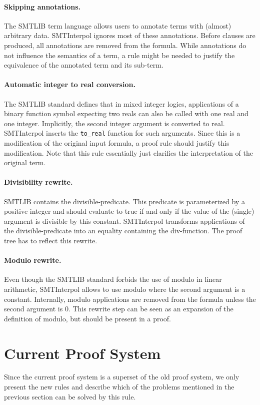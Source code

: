 \documentclass[a4paper]{article}
\newcommand\si{SMTInterpol\xspace}
\begin{document}
\paragraph{Skipping annotations.}  The SMTLIB term language allows users to
annotate terms with (almost) arbitrary data.  \si ignores most of these
annotations.  Before clauses are produced, all annotations are removed
from the formula.  While annotations do not influence the semantics of a term,
a rule might be needed to justify the equivalence of the annotated term and
its sub-term.

\paragraph{Automatic integer to real conversion.}  The SMTLIB standard
defines that in mixed integer logics, applications of a binary
function symbol expecting two reals can also be called with one real
and one integer.  Implicitly, the second integer argument is converted
to real.  \si inserts the \verb+to_real+ function for such arguments.
Since this is a modification of the original input formula, a proof
rule should justify this modification.  Note that this rule
essentially just clarifies the interpretation of the original term.

\paragraph{Divisibility rewrite.}  SMTLIB contains the divisible-predicate.
This predicate is parameterized by a positive integer and should evaluate to
true if and only if the value of the (single) argument is divisible by this
constant.  \si transforms applications of the divisible-predicate into an
equality containing the div-function.  The proof tree has to reflect this
rewrite.

\paragraph{Modulo rewrite.}  Even though the SMTLIB standard forbids the use
of modulo in linear arithmetic, \si allows to use modulo where the second
argument is a constant.  Internally, modulo applications are removed from the
formula unless the second argument is $0$.  This rewrite step can be seen as
an expansion of the definition of modulo, but should be present in a proof.

\section{Current Proof System}
Since the current proof system is a superset of the old proof system, we
only present the new rules and describe which of the problems mentioned in the
previous section can be solved by this rule.
\end{document}
